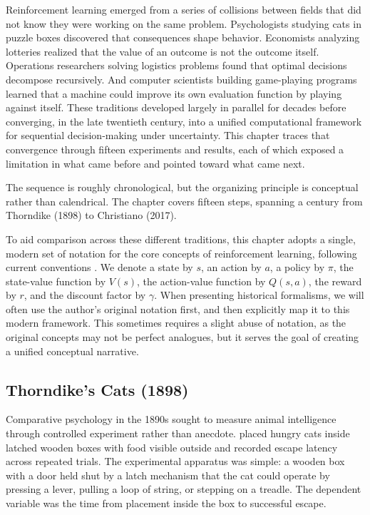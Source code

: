 
Reinforcement learning emerged from a series of collisions between fields that did not know they were working on the same problem. Psychologists studying cats in puzzle boxes discovered that consequences shape behavior. Economists analyzing lotteries realized that the value of an outcome is not the outcome itself. Operations researchers solving logistics problems found that optimal decisions decompose recursively. And computer scientists building game-playing programs learned that a machine could improve its own evaluation function by playing against itself. These traditions developed largely in parallel for decades before converging, in the late twentieth century, into a unified computational framework for sequential decision-making under uncertainty. This chapter traces that convergence through fifteen experiments and results, each of which exposed a limitation in what came before and pointed toward what came next.

The sequence is roughly chronological, but the organizing principle is conceptual rather than calendrical. The chapter covers fifteen steps, spanning a century from Thorndike (1898) to Christiano (2017).

To aid comparison across these different traditions, this chapter adopts a single, modern set of notation for the core concepts of reinforcement learning, following current conventions \citep{sutton2018}. We denote a state by $s$, an action by $a$, a policy by $\pi$, the state-value function by $V(s)$, the action-value function by $Q(s,a)$, the reward by $r$, and the discount factor by $\gamma$. When presenting historical formalisms, we will often use the author's original notation first, and then explicitly map it to this modern framework. This sometimes requires a slight abuse of notation, as the original concepts may not be perfect analogues, but it serves the goal of creating a unified conceptual narrative.

\subsection{Thorndike's Cats (1898)}

Comparative psychology in the 1890s sought to measure animal intelligence through controlled experiment rather than anecdote. \citet{Thorndike1898} placed hungry cats inside latched wooden boxes with food visible outside and recorded escape latency across repeated trials. The experimental apparatus was simple: a wooden box with a door held shut by a latch mechanism that the cat could operate by pressing a lever, pulling a loop of string, or stepping on a treadle. The dependent variable was the time from placement inside the box to successful escape.

